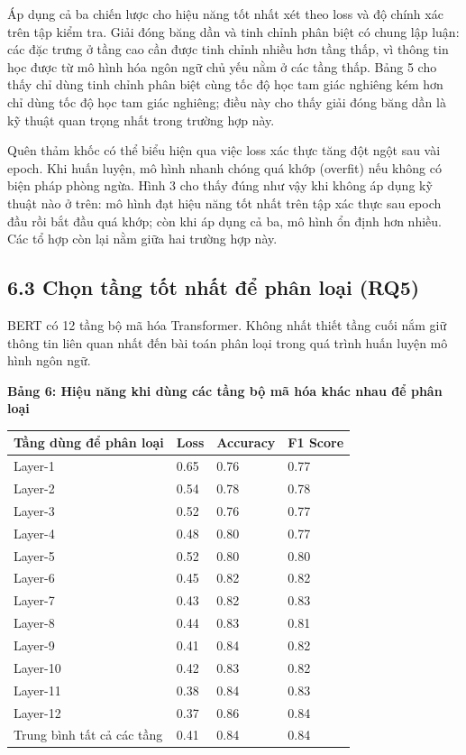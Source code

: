 Áp dụng cả ba chiến lược cho hiệu năng tốt nhất xét theo loss và độ chính xác trên tập kiểm tra. Giải đóng băng dần và tinh chỉnh phân biệt có chung lập luận: các đặc trưng ở tầng cao cần được tinh chỉnh nhiều hơn tầng thấp, vì thông tin học được từ mô hình hóa ngôn ngữ chủ yếu nằm ở các tầng thấp. Bảng 5 cho thấy chỉ dùng tinh chỉnh phân biệt cùng tốc độ học tam giác nghiêng kém hơn chỉ dùng tốc độ học tam giác nghiêng; điều này cho thấy giải đóng băng dần là kỹ thuật quan trọng nhất trong trường hợp này.

Quên thảm khốc có thể biểu hiện qua việc loss xác thực tăng đột ngột sau vài epoch. Khi huấn luyện, mô hình nhanh chóng quá khớp (overfit) nếu không có biện pháp phòng ngừa. Hình 3 cho thấy đúng như vậy khi không áp dụng kỹ thuật nào ở trên: mô hình đạt hiệu năng tốt nhất trên tập xác thực sau epoch đầu rồi bắt đầu quá khớp; còn khi áp dụng cả ba, mô hình ổn định hơn nhiều. Các tổ hợp còn lại nằm giữa hai trường hợp này.

\subsection{6.3 Chọn tầng tốt nhất để phân loại (RQ5)}

BERT có 12 tầng bộ mã hóa Transformer. Không nhất thiết tầng cuối nắm giữ thông tin liên quan nhất đến bài toán phân loại trong quá trình huấn luyện mô hình ngôn ngữ.

\textbf{Bảng 6: Hiệu năng khi dùng các tầng bộ mã hóa khác nhau để phân loại}

{\small
\begin{longtable}[]{@{}llll@{}}
\toprule\noalign{}
Tầng dùng để phân loại & Loss & Accuracy & F1 Score \\
\midrule\noalign{}
\endhead
\bottomrule\noalign{}
\endlastfoot
Layer-1 & 0.65 & 0.76 & 0.77 \\
Layer-2 & 0.54 & 0.78 & 0.78 \\
Layer-3 & 0.52 & 0.76 & 0.77 \\
Layer-4 & 0.48 & 0.80 & 0.77 \\
Layer-5 & 0.52 & 0.80 & 0.80 \\
Layer-6 & 0.45 & 0.82 & 0.82 \\
Layer-7 & 0.43 & 0.82 & 0.83 \\
Layer-8 & 0.44 & 0.83 & 0.81 \\
Layer-9 & 0.41 & 0.84 & 0.82 \\
Layer-10 & 0.42 & 0.83 & 0.82 \\
Layer-11 & 0.38 & 0.84 & 0.83 \\
Layer-12 & 0.37 & 0.86 & 0.84 \\
Trung bình tất cả các tầng & 0.41 & 0.84 & 0.84 \\
\end{longtable}
}

